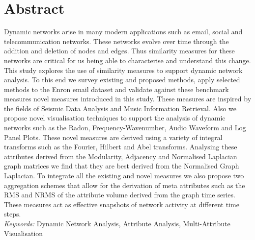 \chapter*{Abstract}

Dynamic networks arise in many modern applications such as email, social and telecommunication networks. These networks evolve over time through the addition and deletion of nodes and edges. Thus similarity measures for these networks are critical for us being able to characterise and understand this change. This study explores the use of similarity measures to support dynamic network analysis. To this end we survey existing and proposed methods, apply selected methods to the Enron email dataset and validate against these benchmark measures novel measures introduced in this study. These measures are inspired by the fields of Seismic Data Analysis and Music Information Retrieval. Also we propose novel visualisation techniques to support the analysis of dynamic networks such as the Radon, Frequency-Wavenumber, Audio Waveform and Log Panel Plots. These novel measures are derived using a variety of integral transforms such as the Fourier, Hilbert and Abel transforms. Analysing these attributes derived from the Modularity, Adjacency and Normalised Laplacian graph matrices 
we find that they are best derived from the Normalised Graph Laplacian. To integrate all the existing and novel measures we also propose two aggregation schemes that allow for the derivation of meta attributes such as the RMS and NRMS of the attribute volume derived from the graph time series.  These measures act as effective snapshots of network activity at different time steps.\\

\emph{Keywords:} Dynamic Network Analysis, Attribute Analysis, Multi-Attribute Visualisation
